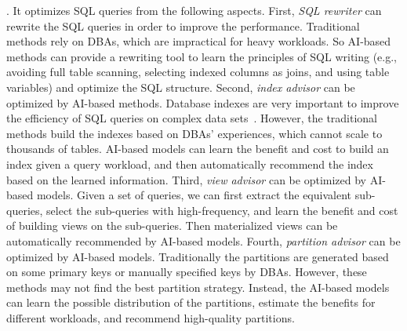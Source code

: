 

. It optimizes SQL queries from the following aspects. First, {\it SQL rewriter} can rewrite the SQL queries in order to improve the performance. Traditional methods rely on DBAs, which are  impractical for heavy workloads. So AI-based methods can provide a rewriting tool to learn the principles of SQL writing (e.g., avoiding full table scanning, selecting indexed columns as joins, and using table variables) and optimize the SQL structure. Second, {\it index advisor} can be optimized by AI-based methods. Database indexes are very important to improve the efficiency of SQL queries on complex data sets~\cite{DBLP:journals/kais/GaniSSH16}. However, the traditional methods build the indexes based on DBAs' experiences, which cannot scale to thousands of tables. AI-based models can learn the benefit and cost to build an index given a query workload, and then automatically recommend the index based on the learned information. Third, \textit{view advisor} can be optimized by AI-based models. Given a set of queries, we can first extract the equivalent sub-queries, select the sub-queries with high-frequency, and learn the benefit and cost of building views on the sub-queries. Then materialized views can be automatically recommended by AI-based models. Fourth, {\it partition advisor} can be optimized by AI-based models. Traditionally the partitions are generated based on some primary keys or manually specified keys by DBAs. However, these methods may not find the best partition strategy. Instead, the AI-based models can learn the possible distribution of the partitions, estimate the benefits for different workloads, and recommend high-quality partitions.
 
